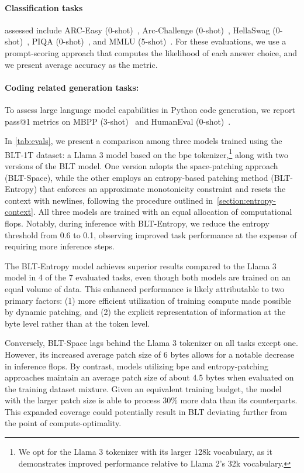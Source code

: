 \paragraph{Classification tasks} assessed include ARC-Easy (0-shot)~\citep{Eval_ARC}, Arc-Challenge (0-shot)~\citep{Eval_ARC}, HellaSwag (0-shot)~\citep{Eval_hellaswag}, PIQA (0-shot)~\citep{Eval_piqa}, and MMLU (5-shot)~\citep{hendrycks2020measuring}. For these evaluations, we use a prompt-scoring approach that computes the likelihood of each answer choice, and we present average accuracy as the metric.
\paragraph{Coding related generation tasks:} To assess large language model capabilities in Python code generation, we report pass@1 metrics on MBPP (3-shot)~\citep{Eval_MBPP} and HumanEval (0-shot)~\citep{Eval_HumanEval}.

In \autoref{tab:evals}, we present a comparison among three models trained using the {\textsc BLT}-1T dataset: a Llama 3 model based on the bpe tokenizer,\footnote{We opt for the Llama 3 tokenizer with its larger 128k vocabulary, as it demonstrates improved performance relative to Llama 2’s 32k vocabulary.} along with two versions of the {\textsc BLT} model. One version adopts the space-patching approach ({\textsc BLT}-Space), while the other employs an entropy-based patching method ({\textsc BLT}-Entropy) that enforces an approximate monotonicity constraint and resets the context with newlines, following the procedure outlined in~\autoref{section:entropy-context}. All three models are trained with an equal allocation of computational flops. Notably, during inference with {\textsc BLT}-Entropy, we reduce the entropy threshold from 0.6 to 0.1, observing improved task performance at the expense of requiring more inference steps.

The {\textsc BLT}-Entropy model achieves superior results compared to the Llama 3 model in 4 of the 7 evaluated tasks, even though both models are trained on an equal volume of data. This enhanced performance is likely attributable to two primary factors: (1) more efficient utilization of training compute made possible by dynamic patching, and (2) the explicit representation of information at the byte level rather than at the token level.

Conversely, {\textsc BLT}-Space lags behind the Llama 3 tokenizer on all tasks except one. However, its increased average patch size of 6 bytes allows for a notable decrease in inference flops. By contrast, models utilizing bpe and entropy-patching approaches maintain an average patch size of about 4.5 bytes when evaluated on the training dataset mixture. Given an equivalent training budget, the model with the larger patch size is able to process 30\% more data than its counterparts. This expanded coverage could potentially result in {\textsc BLT} deviating further from the point of compute-optimality.


